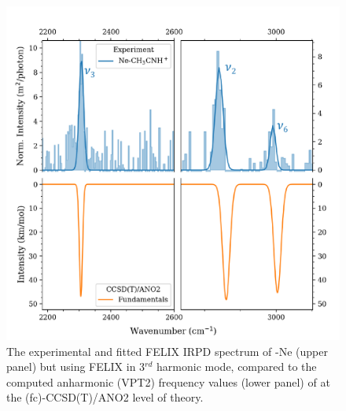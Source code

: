 \begin{figure}
	\centering

		\includegraphics[scale=.7]{chapters/CH3CNH+/figures/felix_2_rev.pdf}
	\caption{The experimental and fitted FELIX IRPD spectrum of \pan-Ne (upper panel) but using FELIX in 3$^{rd}$ harmonic mode, compared to the computed anharmonic (VPT2) frequency values (lower panel) of \pa at the (fc)-CCSD(T)/ANO2 level of theory.}
	\label{FIG:felix_2}
	
\end{figure}

